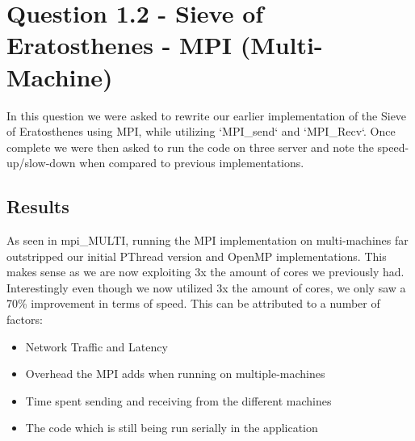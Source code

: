\section*{Question 1.2 - Sieve of Eratosthenes - MPI (Multi-Machine)}

In this question we were asked to rewrite our earlier implementation of the 
Sieve of Eratosthenes using MPI, while utilizing `MPI\_send` and `MPI\_Recv`. 
Once complete we were then asked to run the code on three server and note the 
speed-up/slow-down when compared to previous implementations.

\subsection*{Results}

As seen in {mpi\_MULTI}, running the MPI implementation on multi-machines far 
outstripped our initial PThread version and OpenMP implementations.
This makes sense as we are now exploiting 3x the amount of cores we previously had.
Interestingly even though we now utilized 3x the amount of cores, we only saw a 
70\% improvement in terms of speed. This can be attributed to a number of factors:

\begin{itemize}
    \item Network Traffic and Latency
    \item Overhead the MPI adds when running on multiple-machines
    \item Time spent sending and receiving from the different machines
    \item The code which is still being run serially in the application
\end{itemize}